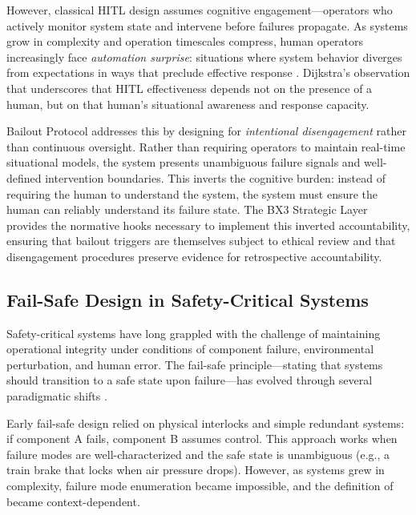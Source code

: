 However, classical HITL design assumes cognitive engagement—operators who actively monitor system state and intervene before failures propagate. As systems grow in complexity and operation timescales compress, human operators increasingly face \emph{automation surprise}: situations where system behavior diverges from expectations in ways that preclude effective response \cite{wiener1948}. Dijkstra's observation that  \cite{dijkstra1982} underscores that HITL effectiveness depends not on the presence of a human, but on that human's situational awareness and response capacity.

Bailout Protocol addresses this by designing for \emph{intentional disengagement} rather than continuous oversight. Rather than requiring operators to maintain real-time situational models, the system presents unambiguous failure signals and well-defined intervention boundaries. This inverts the cognitive burden: instead of requiring the human to understand the system, the system must ensure the human can reliably understand its failure state. The BX3 Strategic Layer provides the normative hooks necessary to implement this inverted accountability, ensuring that bailout triggers are themselves subject to ethical review and that disengagement procedures preserve evidence for retrospective accountability.

\subsection{Fail-Safe Design in Safety-Critical Systems}

Safety-critical systems have long grappled with the challenge of maintaining operational integrity under conditions of component failure, environmental perturbation, and human error. The fail-safe principle—stating that systems should transition to a safe state upon failure—has evolved through several paradigmatic shifts \cite{tristr81}.

Early fail-safe design relied on physical interlocks and simple redundant systems: if component A fails, component B assumes control. This approach works when failure modes are well-characterized and the safe state is unambiguous (e.g., a train brake that locks when air pressure drops). However, as systems grew in complexity, failure mode enumeration became impossible, and the definition of  became context-dependent.

